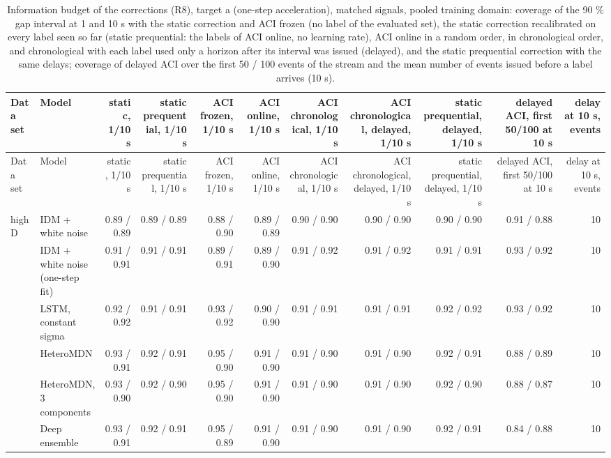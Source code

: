 \begin{longtable}{llrrrrrrrrr}
\caption{Information budget of the corrections (R8), target a (one-step acceleration), matched signals, pooled training domain: coverage of the 90 \% gap interval at 1 and 10 s with the static correction and ACI frozen (no label of the evaluated set), the static correction recalibrated on every label seen so far (static prequential: the labels of ACI online, no learning rate), ACI online in a random order, in chronological order, and chronological with each label used only a horizon after its interval was issued (delayed), and the static prequential correction with the same delays; coverage of delayed ACI over the first 50 / 100 events of the stream and the mean number of events issued before a label arrives (10 s).}\label{tab:t4-info-budget--pool--a} \\
\toprule
Data set & Model & static, 1/10 s & static prequential, 1/10 s & ACI frozen, 1/10 s & ACI online, 1/10 s & ACI chronological, 1/10 s & ACI chronological, delayed, 1/10 s & static prequential, delayed, 1/10 s & delayed ACI, first 50/100 at 10 s & delay at 10 s, events \\
\midrule
\endfirsthead
\toprule
Data set & Model & static, 1/10 s & static prequential, 1/10 s & ACI frozen, 1/10 s & ACI online, 1/10 s & ACI chronological, 1/10 s & ACI chronological, delayed, 1/10 s & static prequential, delayed, 1/10 s & delayed ACI, first 50/100 at 10 s & delay at 10 s, events \\
\midrule
\endhead
\bottomrule
\endlastfoot
highD & IDM + white noise & 0.89 / 0.89 & 0.89 / 0.89 & 0.88 / 0.90 & 0.89 / 0.89 & 0.90 / 0.90 & 0.90 / 0.90 & 0.90 / 0.90 & 0.91 / 0.88 & 10 \\
 & IDM + white noise (one-step fit) & 0.91 / 0.91 & 0.91 / 0.91 & 0.89 / 0.91 & 0.89 / 0.90 & 0.91 / 0.92 & 0.91 / 0.92 & 0.91 / 0.91 & 0.93 / 0.92 & 10 \\
 & LSTM, constant sigma & 0.92 / 0.92 & 0.91 / 0.91 & 0.93 / 0.92 & 0.90 / 0.90 & 0.91 / 0.91 & 0.91 / 0.91 & 0.92 / 0.92 & 0.93 / 0.92 & 10 \\
 & HeteroMDN & 0.93 / 0.91 & 0.92 / 0.91 & 0.95 / 0.90 & 0.91 / 0.90 & 0.91 / 0.90 & 0.91 / 0.90 & 0.92 / 0.91 & 0.88 / 0.89 & 10 \\
 & HeteroMDN, 3 components & 0.93 / 0.90 & 0.92 / 0.90 & 0.95 / 0.90 & 0.91 / 0.90 & 0.91 / 0.90 & 0.91 / 0.90 & 0.92 / 0.90 & 0.88 / 0.87 & 10 \\
 & Deep ensemble & 0.93 / 0.91 & 0.92 / 0.91 & 0.95 / 0.89 & 0.91 / 0.90 & 0.91 / 0.90 & 0.91 / 0.90 & 0.92 / 0.91 & 0.84 / 0.88 & 10 \\

\end{longtable}

